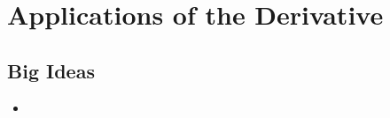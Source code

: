 \chapter{Applications of the Derivative}
\label{chap:AD}

\section{Big Ideas}
\label{sec:AD Big Ideas}
\begin{itemize}
  \item 
\end{itemize}